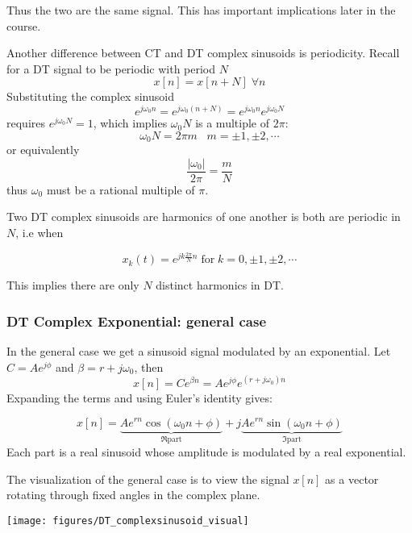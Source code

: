 Thus the two are the same signal. This has important implications later in the course.

Another difference between CT and DT complex sinusoids is periodicity. Recall for a DT signal to be periodic with period $N$
\[
x[n] = x[n+N] \; \forall n
\]
Substituting the complex sinusoid
\[
e^{j\omega_0 n} = e^{j\omega_0 (n+N)} = e^{j\omega_0 n}e^{j\omega_0 N}
\]
requires $e^{j\omega_0 N} = 1$, which implies $\omega_0 N$ is a multiple of $2\pi$:
\[
\omega_0 N = 2\pi m \;\;\; m = \pm 1, \pm 2, \cdots
\]
or equivalently
\[
\frac{|\omega_0|}{2\pi} = \frac{m}{N}
\]
thus $\omega_0$ must be a rational multiple of $\pi$. 

Two DT complex sinusoids are harmonics of one another is both are periodic in $N$,  i.e when

\[
x_k(t) = e^{jk\frac{2\pi}{N} n} \; \text{for} \; k = 0, \pm 1, \pm 2, \cdots
\]

This implies there are only $N$ distinct harmonics in DT.


\subsubsection{DT Complex Exponential: general case}

In the general case we get a sinusoid signal modulated by an exponential. Let $C = Ae^{j\phi}$ and $\beta = r + j\omega_0$, then
\[
x[n] = C e^{\beta n} =  Ae^{j\phi} e^{(r+j\omega_0)n}
\]
Expanding the terms and using Euler's identity gives:

\[
x[n] = \underbrace{Ae^{rn}\cos(\omega_0 n+\phi)}_{\Re \text{part}} + j \underbrace{Ae^{rn}\sin(\omega_0 n+\phi)}_{\Im \text{part}}
\]
Each part is a real sinusoid whose amplitude is modulated by a real exponential.

The visualization of the general case is to view the signal $x[n]$ as a vector rotating through fixed angles in the complex plane.

\begin{center}
\texttt{[image: figures/DT\_complexsinusoid\_visual]}
\end{center}
